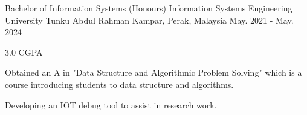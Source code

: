 

\begin{cventries}

  \cventry
    {Bachelor of Information Systems (Honours) Information Systems Engineering} %
    {University Tunku Abdul Rahman} %
    {Kampar, Perak, Malaysia} %
    {May. 2021 - May. 2024} %
    {
      \begin{cvitems} %
        \item {3.0 CGPA}
        \item {Obtained an A in "Data Structure and Algorithmic Problem Solving" which is a course introducing students to data structure and algorithms.}
        \item {Developing an IOT debug tool to assist in research work.}
      \end{cvitems}
    }
\end{cventries}
